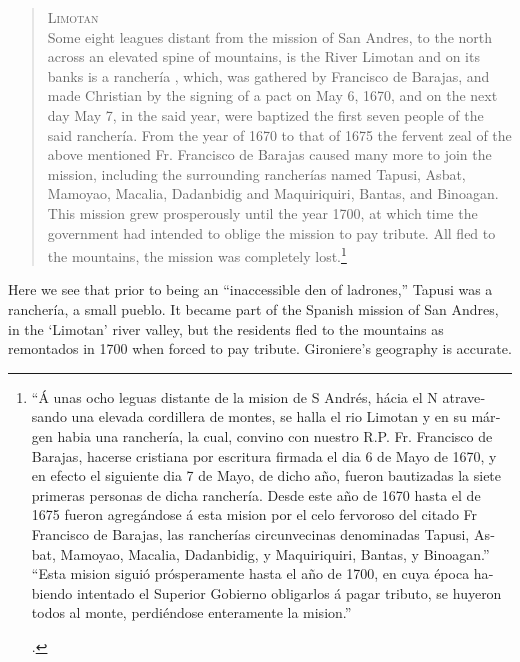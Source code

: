 \begin{quote}
\textsc{Limotan}\\ 
Some eight leagues distant from the mission of San Andres, to the north across an elevated spine of mountains, is the River Limotan and on its banks is a rancher\'ia , which, was gathered by Francisco de Barajas, and made Christian by the signing of a pact on May 6, 1670, and on the next day May 7, in the said year, were baptized the first seven people of the said rancher\'ia. From the year of 1670 to that of 1675 the fervent zeal of the above mentioned Fr. Francisco de Barajas caused many more to join the mission, including the surrounding rancher\'ias named Tapusi, Asbat, Mamoyao, Macalia, Dadanbidig and Maquiriquiri, Bantas, and Binoagan.\\
This mission grew prosperously until the year 1700, at which time the government had intended to oblige the mission to pay tribute. All fled to the mountains, the mission was completely lost.\footnote{\begin{otherlanguage}{spanish}\enquote{\'A unas ocho leguas distante de la mision de S Andr\'es, h\'acia el N atravesando una elevada cordillera de montes, se halla el rio Limotan y en su márgen habia una rancher\'ia, la cual, convino con nuestro R.P. Fr. Francisco de Barajas, hacerse cristiana por escritura firmada el dia 6 de Mayo de 1670, y en efecto el siguiente dia 7 de Mayo, de dicho a\~no, fueron bautizadas la siete primeras personas de dicha rancher\'ia. Desde este a\~no de 1670 hasta el de 1675 fueron agreg\'andose \'a esta mision por el celo fervoroso del citado Fr Francisco de Barajas, las rancher\'ias circunvecinas denominadas Tapusi, Asbat, Mamoyao, Macalia, Dadanbidig, y Maquiriquiri, Bantas, y Binoagan.}\\ 
\enquote{Esta mision sigui\'o prósperamente hasta el a\~no de 1700, en cuya \'epoca habiendo intentado el Superior Gobierno obligarlos \'a pagar tributo, se huyeron todos al monte, perdi\'endose enteramente la mision.} \end{otherlanguage} \parencite[573]{Huerta1863}. 
}
\end{quote}

Here we see that prior to being an \enquote{inaccessible den of ladrones,} Tapusi was a rancher\'ia, a small pueblo. It became part of the Spanish mission of San Andres, in the \enquote*{Limotan} river valley, but the residents fled to the mountains as remontados in 1700 when forced to pay tribute. Gironiere's geography is accurate.

